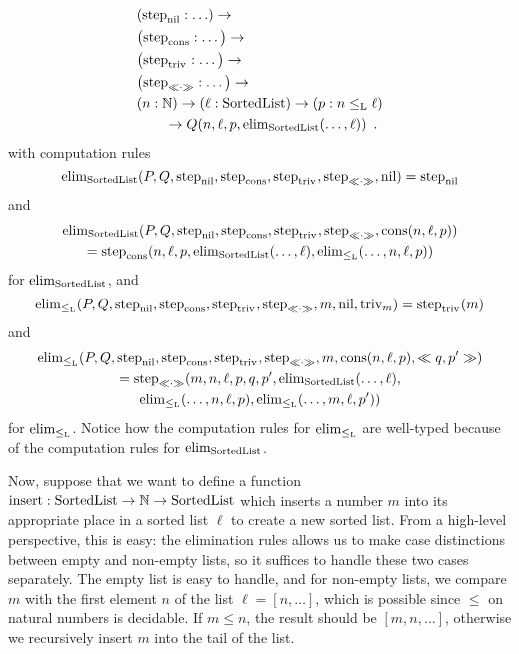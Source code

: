 \documentclass{article}
\begin{document}
\begin{example}
\begin{align*}
                       & (\stepind{\nilList} : \ldots) \to \\
                       & \big(\stepind{\consListbare} : \ldots\big) \to \\
                       & \big(\stepind{\nilLess{}} : \ldots\big) \to \\
                       & \big(\stepind{\consLessbare} : \ldots\big) \to \\
                       & (n : \Nat) \to (\ell : \SortedList) \to (p : n \lessList \ell) \\
                       & \qquad \to Q(n, \ell, p, \elim_{\SortedList}(\ldots, \ell)) \enspace .
  \end{align*}
with computation rules
%
\[
\elim_{\SortedList}(P, Q, \stepind{\nilList}, \stepind{\consListbare}, \stepind{\nilLess{}}, \stepind{\consLessbare}, \nilList) = \stepind{\nilList}
\]
and
\begin{multline*}
\elim_{\SortedList}(P, Q, \stepind{\nilList}, \stepind{\consListbare}, \stepind{\nilLess{}}, \stepind{\consLessbare}, \consList{n}{\ell}{p}) \\
= \stepind{\consListbare}(n, \ell, p, \elim_{\SortedList}(\ldots, \ell), 
\elim_{\lessList}(\ldots, n, \ell, p))  
\end{multline*}
%
for $\elim_{\SortedList}$, and
\[
\elim_{\lessList}(P, Q, \stepind{\nilList}, \stepind{\consListbare}, \stepind{\nilLess{}}, \stepind{\consLessbare}, m, \nilList, \nilLess{m}) = \stepind{\nilLess{}}(m)
\]
and
\begin{multline*}
\elim_{\lessList}(P, Q, \stepind{\nilList}, \stepind{\consListbare}, \stepind{\nilLess{}}, \stepind{\consLessbare}, m, \consList{n}{\ell}{p}, \consLess{m}{n}{\ell}{p}{q}{p'}) \\
= \stepind{\consLessbare}(m, n, \ell, p, q, p', \elim_{\SortedList}(\ldots, \ell), \\
\elim_{\lessList}(\ldots, n, \ell, p), \elim_{\lessList}(\ldots, m, \ell, p'))
\end{multline*}
for $\elim_{\lessList}$. Notice how the computation rules for
$\elim_{\lessList}$ are well-typed because of the computation rules
for $\elim_{\SortedList}$.

Now, suppose that we want to define a function $\Listinsert :
\SortedList \to \Nat \to \SortedList$ which inserts a number $m$ into
its appropriate place in a sorted list $\ell$ to create a new sorted
list. From a high-level perspective, this is easy: the elimination
rules allows us to make case distinctions between empty and non-empty
lists, so it suffices to handle these two cases separately. The empty
list is easy to handle, and for non-empty lists, we compare $m$ with
the first element $n$ of the list $\ell = [n, \ldots]$, which is
possible since $\leq$ on natural numbers is decidable. If $m \leq n$,
the result should be $[m, n, \ldots]$, otherwise we recursively insert
$m$ into the tail of the list.


\end{example}
\end{document}

